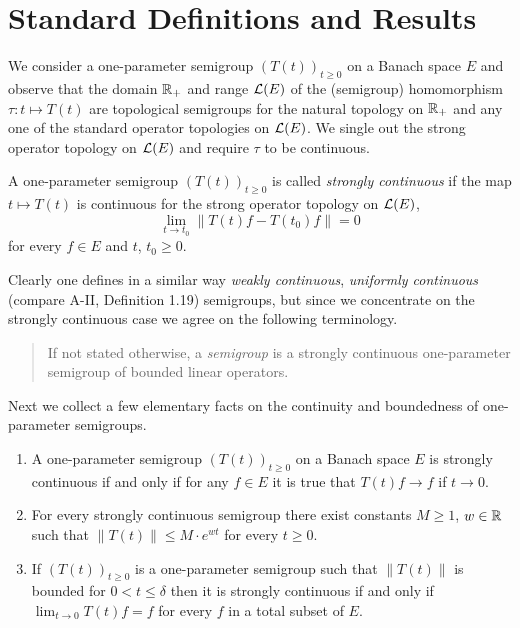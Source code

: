 \section{Standard Definitions and Results}\label{sec:a1-1}
We consider a one-parameter semigroup $(T(t))_{t \geq 0}$ on a Banach space $E$ 
and observe that the domain $\mathbb{R}_{+}$ and range $\mathcal{L}(E)$ of the (semigroup) homomorphism $\tau \colon t \mapsto T(t)$ are topological semigroups for the natural topology on $\mathbb{R}_{+}$ and any one of the standard operator topologies on $\mathcal{L}(E)$.
We single out the strong operator topology on $\mathcal{L}(E)$ and require $\tau$ to be continuous.
\begin{definition}\label{def:a1-1.1}
A one-parameter semigroup $(T(t))_{t\geq0}$ is called \emph{strongly continuous} if the map $t \mapsto T(t)$ is continuous for the strong operator topology on $\mathcal{L}(E)$, \eg
\[
	\lim_{t\to t_{0}} \|T(t)f - T(t_{0})f\| = 0
\]
for every $f \in E$ and $t$, $t_{0} \geq 0$.
\end{definition}
Clearly one defines in a similar way \emph{weakly continuous}, \resp \emph{uniformly continuous} (compare A-II, Definition  1.19) semigroups, but since we concentrate on the strongly continuous case we agree on the following terminology.
\begin{quote}
If not stated otherwise, a \emph{semigroup} is a strong\-ly continuous one-parameter semigroup of bounded linear operators. 
\end{quote}
Next we collect a few elementary facts on the continuity and boundedness of one-parameter semigroups.
\begin{remarks}\label{rem:a1-1.2}
\begin{enumerate}[\upshape(i), wide, labelindent=.5em]

\item 
A one-parameter semigroup $(T(t))_{t \geq 0}$ on a Banach space $E$ is strongly continuous if and only if for any $f \in E$ it is true that $T(t)f \to f$ if $t \to 0$.

\item 
For every strongly continuous semigroup there exist constants $M \geq 1$, $w \in \mathbb{R}$ such that $\|T(t)\| \leq M \cdot e^{wt}$ for every $t \geq 0$.
\item If $(T(t))_{t\geq0}$ is a one-parameter semigroup such that $\|T(t)\|$ is bounded for $0 < t \leq \delta$ then it is strongly continuous if and only if $\lim_{t \to 0} T(t)f = f$ for every $f$ in a total subset of $E$.
\end{enumerate}
\end{remarks}
